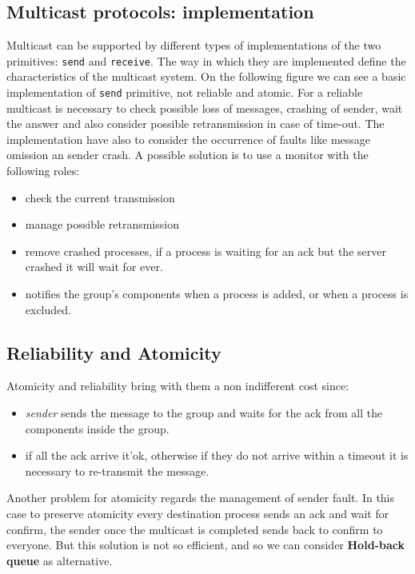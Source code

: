 \documentclass[11pt,a4paper]{article}
\begin{document}
\subsection{Multicast protocols: implementation}
Multicast can be supported by different types of implementations of the two primitives: \verb!send! and \verb!receive!. The way in which they are implemented define the characteristics of the multicast system.
On the following figure we can see a basic implementation of \verb!send! primitive, not reliable and atomic.
For a reliable multicast is necessary to check possible loss of messages, crashing of sender, wait the answer and also consider possible retransmission in case of time-out.
The implementation have also to consider the occurrence of faults like message omission an sender crash. A possible solution is to use a monitor with the following roles:
\begin{itemize}
	\item check the current transmission
	\item manage possible retransmission
	\item remove crashed processes, if a process is waiting for an ack but the server crashed it will wait for ever.
	\item notifies the group’s components when a process is added, or when a process is excluded.
\end{itemize}

\subsection{Reliability and Atomicity}
Atomicity and reliability bring with them a non indifferent cost since:
\begin{itemize}
	\item \textit{sender} sends the message to the group and waits for the ack from all the components inside the group.
	\item if all the ack arrive it'ok, otherwise if they do not arrive within a timeout it is necessary to re-transmit the message.
\end{itemize}
Another problem for atomicity regards the management of sender fault. In this case to preserve atomicity every destination process sends an ack and wait for confirm, the sender once the multicast is completed sends back to confirm to everyone. But this solution is not so efficient, and so we can consider \textbf{Hold-back queue} as alternative.
\end{document}
